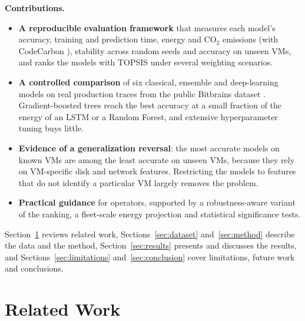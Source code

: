 \documentclass[conference,letterpaper,10pt]{IEEEtran}
\begin{document}
\textbf{Contributions.}
\begin{itemize}
  \item \textbf{A reproducible evaluation framework} that measures each model's accuracy, training and prediction time, energy and CO$_2$ emissions (with CodeCarbon \cite{courty2024codecarbon}), stability across random seeds and accuracy on unseen VMs, and ranks the models with TOPSIS \cite{hwang1981topsis} under several weighting scenarios.
  \item \textbf{A controlled comparison} of six classical, ensemble and deep-learning models on real production traces from the public Bitbrains dataset \cite{shen2015bitbrains}. Gradient-boosted trees reach the best accuracy at a small fraction of the energy of an LSTM or a Random Forest, and extensive hyperparameter tuning buys little.
  \item \textbf{Evidence of a generalization reversal}: the most accurate models on known VMs are among the least accurate on unseen VMs, because they rely on VM-specific disk and network features. Restricting the models to features that do not identify a particular VM largely removes the problem.
  \item \textbf{Practical guidance} for operators, supported by a robustness-aware variant of the ranking, a fleet-scale energy projection and statistical significance tests.
\end{itemize}

Section~\ref{sec:related} reviews related work, Sections~\ref{sec:dataset} and~\ref{sec:method} describe the data and the method, Section~\ref{sec:results} presents and discusses the results, and Sections~\ref{sec:limitations} and~\ref{sec:conclusion} cover limitations, future work and conclusions.

\section{Related Work}
\label{sec:related}
\end{document}
